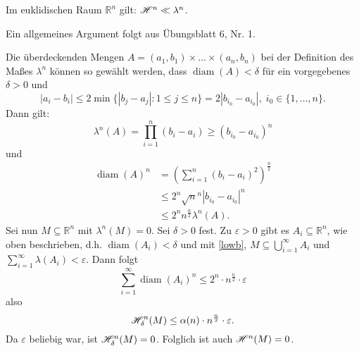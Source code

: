 \documentclass[a4paper,twoside,DIV15,BCOR12mm]{scrbook}
\newcommand{\HM}{\H}
\DeclareMathOperator{\diam}{diam}
\begin{document}
\begin{lemma}\label{lem:2.28}
Im euklidischen Raum \(\mathbb R^n\) gilt: \(\HM^n \ll \lambda^n\).
\end{lemma}
\begin{beweis}
Ein allgemeines Argument folgt aus Übungsblatt 6, Nr. 1.
\par
Die überdeckenden Mengen \(A=(a_1,b_1) \times \dots \times (a_n,b_n)\) bei der Definition des Maßes \(\lambda^n\) können so gewählt werden, dass \(\diam(A) < \delta\) für ein vorgegebenes \(\delta > 0\) und
\begin{equation}\label{lowb}
 |a_i-b_i| \leq 2 \min\{|b_j-a_j| \colon 1 \leq j \leq n\} = 2|b_{i_0}-a_{i_0}|, \; i_0 \in \{1,\dots,n\}.
\end{equation}
Dann gilt:
\[
\lambda^n(A) = \prod_{i=1}^n(b_i-a_i) \geq (b_{i_0}-a_{i_0})^n
\]
und
\begin{align*}
\diam(A)^n &= \left( \sum_{i=1}^n (b_i-a_i)^2 \right)^{\frac{n}2} \\
&\leq 2^n {\sqrt n}^n |b_{i_0}-a_{i_0}|^n \\
&\leq 2^n n^{\frac{n}2} \lambda^n(A).
\end{align*}
Sei nun \(M \subseteq \mathbb R^n\) mit \(\lambda^n(M)=0\). Sei \(\delta > 0\) fest. Zu \(\varepsilon > 0\) gibt es \(A_i \subseteq \mathbb R^n\), wie oben beschrieben, d.h. \(\diam(A_i) < \delta\) und mit \eqref{lowb}, \(M \subseteq \bigcup_{i=1}^\infty A_i\) und \(\sum_{i=1}^\infty \lambda(A_i) < \varepsilon\). Dann folgt
$$ \sum_{i=1}^\infty \diam(A_i)^n \leq 2^n \cdot n^{\frac{n}2} \cdot \varepsilon 
$$
also
$$ 
\HM^n_\delta(M) \leq \alpha(n) \cdot  n^{\frac{n}2} \cdot \varepsilon. 
$$
Da \(\varepsilon\) beliebig war, ist \(\HM^n_\delta(M)=0\). Folglich ist auch \(\HM^n(M)=0\).
\end{beweis}
\end{document}
